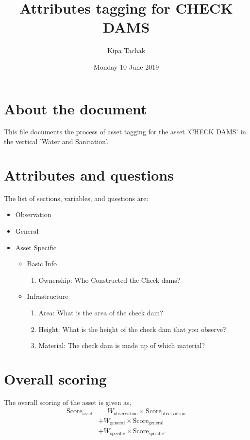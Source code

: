 \documentclass[oneside,twocolumn]{article}
\title{Attributes tagging for CHECK DAMS}
\author{Kipa Tachak}
\date{Monday 10 June 2019}
\newcommand{\tsub}[2]{\text{#1}_{\text{#2}}}
\newcommand{\tsubb}[2]{#1_{\text{#2}}}
\begin{document}
\maketitle

\section{About the document}
This file documents the process of asset tagging for the asset 'CHECK DAMS' in the
vertical 'Water and Sanitation'.

\section{Attributes and questions}
The list of sections, variables, and questions are:
    \begin{itemize}
    \item Observation
    \item General
    \item Asset Specific
    \begin{itemize}
\item Basic Info
\begin{enumerate}
\item Ownership: Who Constructed the Check dams?
\end{enumerate}

\item Infrastructure
\begin{enumerate}
\item Area: What is the area of the check dam?
\item Height: What is the height of the check dam that you observe?
\item Material: The check dam is made up of which material?
\end{enumerate}

\end{itemize}

    \end{itemize}
\section{Overall scoring}
The overall scoring of the asset is given as,
\begin{align*}
	\tsub{Score}{asset} &= \tsubb{W}{observation} \times \tsub{Score}{observation} \\
	&+ \tsubb{W}{general} \times \tsub{Score}{general} \\
	&+ \tsubb{W}{specific} \times \tsub{Score}{specific}.
\end{align*}
\end{document}
